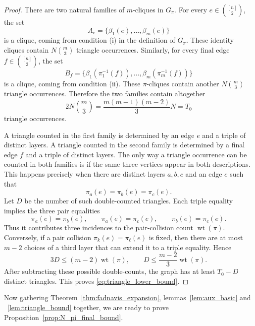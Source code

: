 \documentclass[11pt,reqno]{amsart}
\theoremstyle{definition}
\theoremstyle{remark}
\renewcommand\leq{\leqslant}
\newcommand{\wt}{\operatorname{wt}}
\begin{document}
\begin{proof}
There are two natural families of $m$-cliques in $G_\pi$. For every $e\in\binom{[n]}2$, the set
\[
        A_e=\{\beta_1(e),\ldots,\beta_m(e)\}
\]
is a clique, coming from condition \textup{(i)} in the definition of $G_\pi$. These identity cliques contain $N\binom m3$ triangle occurrences. Similarly, for every final edge $f\in\binom{[n]}2$, the set
\[
        B_f=\{\beta_1(\pi_1^{-1}(f)),\ldots,
              \beta_m(\pi_m^{-1}(f))\}
\]
is a clique, coming from condition \textup{(ii)}. These $\pi$-cliques contain another $N\binom m3$ triangle occurrences. Therefore the two families contain altogether
\[
        2N\binom m3=\frac{m(m-1)(m-2)}3N=T_0
\]
triangle occurrences.

A triangle counted in the first family is determined by an edge $e$ and a triple of distinct layers. A triangle counted in the second family is determined by a final edge $f$ and a triple of distinct layers. The only way a triangle occurrence can be counted in both families is if the same three vertices appear in both descriptions. This happens precisely when there are distinct layers $a,b,c$ and an edge $e$ such that
\[
        \pi_a(e)=\pi_b(e)=\pi_c(e).
\]
Let $D$ be the number of such double-counted triangles. Each triple equality implies the three pair equalities
\[
        \pi_a(e)=\pi_b(e),\qquad
        \pi_a(e)=\pi_c(e),\qquad
        \pi_b(e)=\pi_c(e).
\]
Thus it contributes three incidences to the pair-collision count $\wt(\pi)$. Conversely, if a pair collision $\pi_k(e)=\pi_\ell(e)$ is fixed, then there are at most $m-2$ choices of a third layer that can extend it to a triple equality. Hence
\[
        3D\leq (m-2)\wt(\pi),
        \qquad
        D\leq \frac{m-2}{3}\wt(\pi).
\]
After subtracting these possible double-counts, the graph has at least $T_0-D$ distinct triangles. This proves \eqref{eq:triangle_lower_bound}.
\end{proof}


Now gathering Theorem~\ref{thm:fadnavis_expansion}, lemmas~\ref{lem:aux_basic} and ~\ref{lem:triangle_bound} together, we are ready to prove Proposition~\ref{prop:N_pi_final_bound}.
\end{document}
